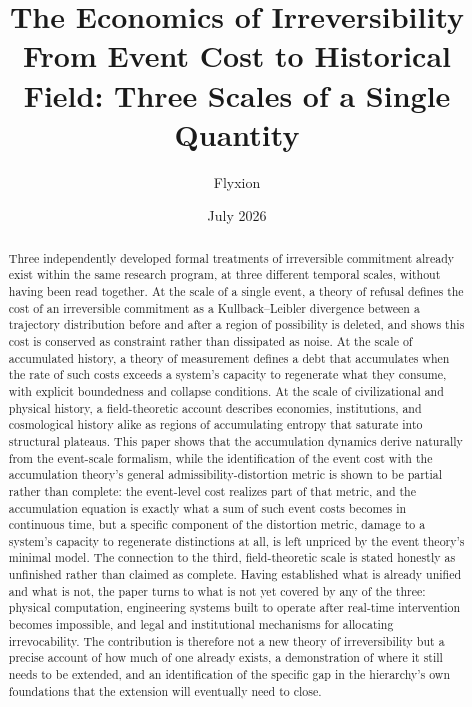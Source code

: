 \documentclass[11pt]{article}
\title{\textbf{The Economics of Irreversibility}\\[0.3em]
\large From Event Cost to Historical Field: Three Scales of a Single Quantity}
\author{Flyxion}
\date{July 2026}
\theoremstyle{plain}
\begin{document}
\maketitle

\begin{abstract}
\noindent
Three independently developed formal treatments of irreversible commitment already exist within the same research program, at three different temporal scales, without having been read together. At the scale of a single event, a theory of refusal defines the cost of an irreversible commitment as a Kullback--Leibler divergence between a trajectory distribution before and after a region of possibility is deleted, and shows this cost is conserved as constraint rather than dissipated as noise. At the scale of accumulated history, a theory of measurement defines a debt that accumulates when the rate of such costs exceeds a system's capacity to regenerate what they consume, with explicit boundedness and collapse conditions. At the scale of civilizational and physical history, a field-theoretic account describes economies, institutions, and cosmological history alike as regions of accumulating entropy that saturate into structural plateaus. This paper shows that the accumulation dynamics derive naturally from the event-scale formalism, while the identification of the event cost with the accumulation theory's general admissibility-distortion metric is shown to be partial rather than complete: the event-level cost realizes part of that metric, and the accumulation equation is exactly what a sum of such event costs becomes in continuous time, but a specific component of the distortion metric, damage to a system's capacity to regenerate distinctions at all, is left unpriced by the event theory's minimal model. The connection to the third, field-theoretic scale is stated honestly as unfinished rather than claimed as complete. Having established what is already unified and what is not, the paper turns to what is not yet covered by any of the three: physical computation, engineering systems built to operate after real-time intervention becomes impossible, and legal and institutional mechanisms for allocating irrevocability. The contribution is therefore not a new theory of irreversibility but a precise account of how much of one already exists, a demonstration of where it still needs to be extended, and an identification of the specific gap in the hierarchy's own foundations that the extension will eventually need to close.
\end{abstract}
\end{document}
